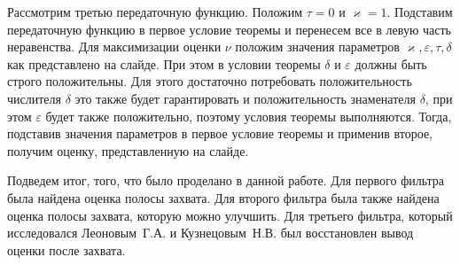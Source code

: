 \documentclass[a4paper,article,14pt]{extarticle}
\begin{document}
Рассмотрим третью передаточную функцию. Положим $\tau = 0$ и $\varkappa = 1$. Подставим передаточную функцию в первое условие теоремы и перенесем все в левую часть неравенства. Для максимизации оценки $\nu$ положим значения параметров $\varkappa, \varepsilon, \tau, \delta$ как представлено на слайде. При этом в условии теоремы $\delta$ и $\varepsilon$ должны быть строго положительны. Для этого достаточно потребовать положительность числителя $\delta$ это также будет гарантировать и положительность знаменателя $\delta$, при этом $\varepsilon$ будет также положительно, поэтому условия теоремы выполняются. Тогда, подставив значения параметров в первое условие теоремы и применив второе, получим оценку, представленную на слайде.

Подведем итог, того, что было проделано в данной работе. Для первого фильтра была найдена оценка полосы захвата. Для второго фильтра была также найдена оценка полосы захвата, которую можно улучшить. Для третьего фильтра, который исследовался Леоновым~Г.\:А. и Кузнецовым~Н.\:В. был восстановлен вывод оценки после захвата.
\end{document}
